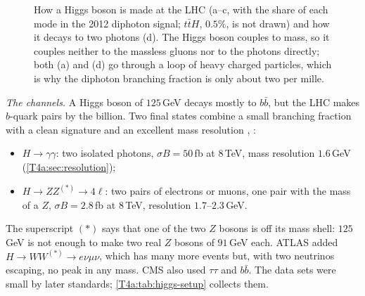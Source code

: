 \begin{figure}[htbp]
\caption{How a Higgs boson is made at the LHC (a--c, with the share of each mode in the 2012 diphoton signal; $t\bar tH$, $0.5\%$, is not drawn) and how it decays to two photons (d). The Higgs boson couples to mass, so it couples neither to the massless gluons nor to the photons directly; both (a) and (d) go through a loop of heavy charged particles, which is why the diphoton branching fraction is only about two per mille.}
\label{T4a:fig:production}
\end{figure}

\emph{The channels.} A Higgs boson of $125$\,GeV decays mostly to $b\bar b$, but the LHC makes $b$-quark pairs by the billion. Two final states combine a small branching fraction with a clean signature and an excellent mass resolution \cite[Secs.~4--5]{AadHiggs2012}, \cite[Sec.~1]{ChatrchyanHiggs2012}:
\begin{itemize}[itemsep=1pt,leftmargin=1.2em]
  \item $H\to\gamma\gamma$: two isolated photons, $\sigma B=50$\,fb at $8$\,TeV, mass resolution $1.6$\,GeV (\cref{T4a:sec:resolution});
  \item $H\to ZZ^{(*)}\to4\ell$: two pairs of electrons or muons, one pair with the mass of a $Z$, $\sigma B=2.8$\,fb at $8$\,TeV, resolution $1.7$--$2.3$\,GeV.
\end{itemize}
The superscript $(*)$ says that one of the two $Z$ bosons is off its mass shell: $125$\,GeV is not enough to make two real $Z$ bosons of $91$\,GeV each. ATLAS added $H\to WW^{(*)}\to e\nu\mu\nu$, which has many more events but, with two neutrinos escaping, no peak in any mass. CMS also used $\tau\tau$ and $b\bar b$. The data sets were small by later standards; \cref{T4a:tab:higgs-setup} collects them.

